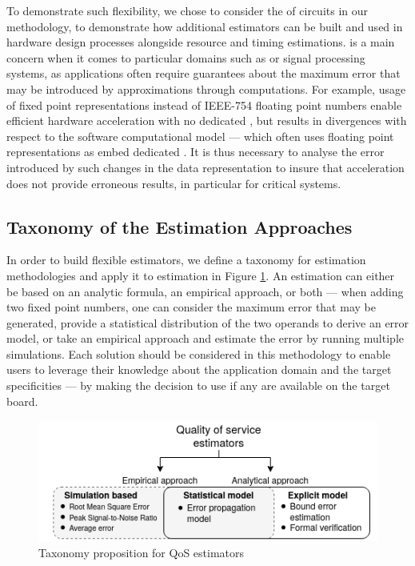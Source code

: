     To demonstrate such flexibility, we chose to consider the  of circuits in our methodology, to demonstrate how additional estimators can be built and used in hardware design processes alongside resource and timing estimations.
     is a main concern when it comes to particular domains such as  or signal processing systems, as applications often require guarantees about the maximum error that may be introduced by approximations through computations.
    For example, usage of fixed point representations instead of IEEE-754 floating point numbers enable efficient hardware acceleration with no dedicated , but results in divergences with respect to the software computational model --- which often uses floating point representations as  embed dedicated .
    It is thus necessary to analyse the error introduced by such changes in the data representation to insure that acceleration does not provide erroneous results, in particular for critical systems.

    \subsection{Taxonomy of the Estimation Approaches}
    \label{ch.estimators:sec.qos:ssec.taxonomy}
    
        In order to build flexible estimators, we define a taxonomy for estimation methodologies and apply it to  estimation in Figure \ref{ch.estimators:sec.qos:ssec.taxonomy:fig.taxonomy}.
        An estimation can either be based on an analytic formula, an empirical approach, or both --- \eg when adding two fixed point numbers, one can consider the maximum error that may be generated, provide a statistical distribution of the two operands to derive an error model, or take an empirical approach and estimate the error by running multiple simulations.
        Each solution should be considered in this methodology to enable users to leverage their knowledge about the application domain and the target specificities --- \eg by making the decision to use  if any are available on the target board.

        \begin{figure}[h!]
            \centering
            \includegraphics[width=1.0\textwidth]{Figures/taxonomy-qos.png}
            \caption{Taxonomy proposition for QoS estimators}
            \label{ch.estimators:sec.qos:ssec.taxonomy:fig.taxonomy}
        \end{figure}

